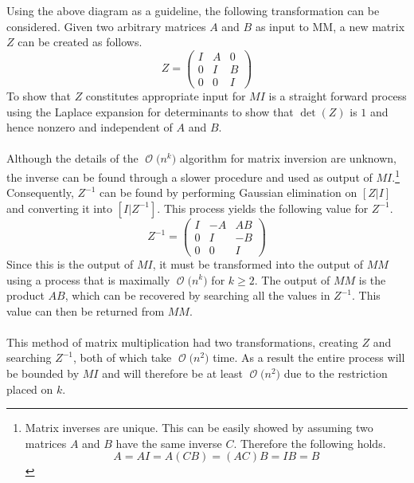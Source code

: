 \documentclass[12pt]{article}
\newcommand{\BigO}[1]{\ensuremath{\operatorname{\mathcal{O}}\bigl(#1\bigr)}}
\begin{document}
Using the above diagram as a guideline, the following transformation
can be considered.  Given two arbitrary matrices $A$ and $B$ as input
to MM, a new matrix $Z$ can be created as follows.
\[
Z =
    \begin{pmatrix}
    I & A & 0 \\
    0 & I & B \\
    0 & 0 & I 
    \end{pmatrix}
\]
To show that $Z$ constitutes appropriate input for $MI$ is a straight
forward process using the Laplace expansion for determinants to show
that $\det(Z)$ is $1$ and hence nonzero and independent of $A$ and $B$.\\\\
Although the details of the \BigO{n^k} algorithm for matrix inversion
are unknown, the inverse can be found through a slower procedure and 
used as output of $MI$.\footnote{Matrix inverses are unique.  This can
be easily showed by assuming two matrices $A$ and $B$ have the same inverse
$C$.  Therefore the following holds.
\[
A = AI = A(CB) = (AC)B = IB = B
\]
}
Consequently, $Z^{-1}$ can be found by performing Gaussian elimination
on $[Z|I]$ and converting it into $[I|Z^{-1}]$.  This process yields the
following value for $Z^{-1}$.
\[
Z^{-1} =
    \begin{pmatrix}
    I & -A & AB \\
    0 & I & -B \\
    0 & 0 & I 
    \end{pmatrix}
\]
Since this is the output of $MI$, it must be transformed into the output
of $MM$ using a process that is maximally \BigO{n^k} for $k\geq2$.  The
output of $MM$ is the product $AB$, which can be recovered by searching 
all the values in $Z^{-1}$.  This value can then be returned from $MM$.\\\\
This method of matrix multiplication had two transformations, creating
$Z$ and searching $Z^{-1}$, both of which take \BigO{n^2} time.  As a result
the entire process will be bounded by $MI$ and will therefore be at least
\BigO{n^2} due to the restriction placed on $k$.
\end{document}
